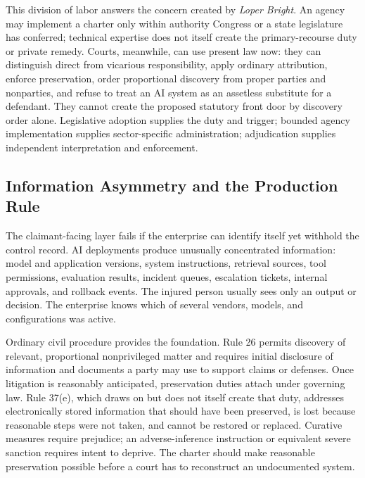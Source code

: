 This division of labor answers the concern created by \emph{Loper Bright}. An agency may implement a charter only within authority Congress or a state legislature has conferred; technical expertise does not itself create the primary-recourse duty or private remedy. Courts, meanwhile, can use present law now: they can distinguish direct from vicarious responsibility, apply ordinary attribution, enforce preservation, order proportional discovery from proper parties and nonparties, and refuse to treat an AI system as an assetless substitute for a defendant. They cannot create the proposed statutory front door by discovery order alone. Legislative adoption supplies the duty and trigger; bounded agency implementation supplies sector-specific administration; adjudication supplies independent interpretation and enforcement.

\subsection{Information Asymmetry and the Production Rule}

The claimant-facing layer fails if the enterprise can identify itself yet withhold the control record. AI deployments produce unusually concentrated information: model and application versions, system instructions, retrieval sources, tool permissions, evaluation results, incident queues, escalation tickets, internal approvals, and rollback events. The injured person usually sees only an output or decision. The enterprise knows which of several vendors, models, and configurations was active.

Ordinary civil procedure provides the foundation. Rule 26 permits discovery of relevant, proportional nonprivileged matter and requires initial disclosure of information and documents a party may use to support claims or defenses. Once litigation is reasonably anticipated, preservation duties attach under governing law. Rule 37(e), which draws on but does not itself create that duty, addresses electronically stored information that should have been preserved, is lost because reasonable steps were not taken, and cannot be restored or replaced. Curative measures require prejudice; an adverse-inference instruction or equivalent severe sanction requires intent to deprive. The charter should make reasonable preservation possible before a court has to reconstruct an undocumented system.


